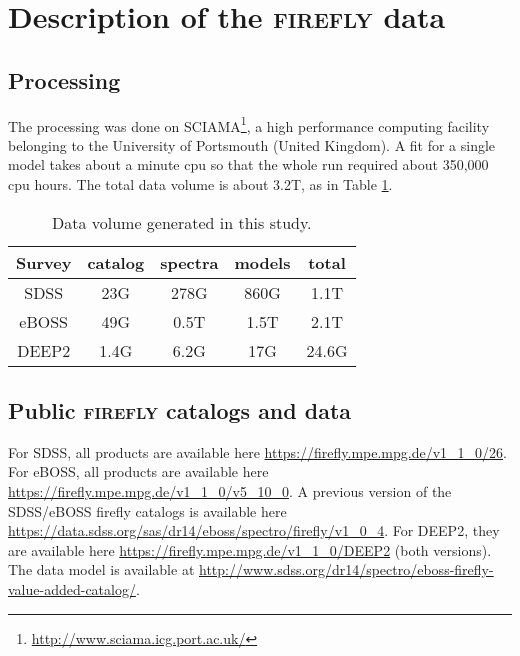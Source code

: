 \documentclass[onecolumn]{aa}
\begin{document}



\clearpage
\appendix
\section{Description of the \textsc{firefly} data}


\subsection{Processing}
\label{subsec:processing}

The processing was done on  SCIAMA\footnote{\url{http://www.sciama.icg.port.ac.uk/}}, a high performance computing facility belonging to the University of Portsmouth (United Kingdom). 
A fit for a single model takes about a minute cpu so that the whole run required about 350,000 cpu hours. 
The total data volume is about 3.2T, as in Table \ref{table:processing}.
\begin{table}
\caption{\label{table:processing} Data volume generated in this study.}
\begin{center}
\begin{tabular}{ccccc}
\hline \hline
Survey &
catalog &
spectra & 
models & total \\ \hline
SDSS
& 23G
& 278G
& 860G 
& 1.1T \\
eBOSS
& 49G
& 0.5T 
& 1.5T 
& 2.1T \\
DEEP2 
& 1.4G
& 6.2G
& 17G
& 24.6G \\
\hline 
\end{tabular}
\end{center}
\end{table}

\subsection{Public \textsc{firefly} catalogs and data}
\label{subsec:public:data}

For SDSS, all products are available here 
\url{https://firefly.mpe.mpg.de/v1_1_0/26}. 
For eBOSS, all products are available here 
\url{https://firefly.mpe.mpg.de/v1_1_0/v5_10_0}. 
A previous version of the SDSS/eBOSS firefly catalogs is available here 
\url{https://data.sdss.org/sas/dr14/eboss/spectro/firefly/v1_0_4}.
For DEEP2, they are available here 
\url{https://firefly.mpe.mpg.de/v1_1_0/DEEP2} (both versions).
The data model is available at \url{http://www.sdss.org/dr14/spectro/eboss-firefly-value-added-catalog/}.
\end{document}

